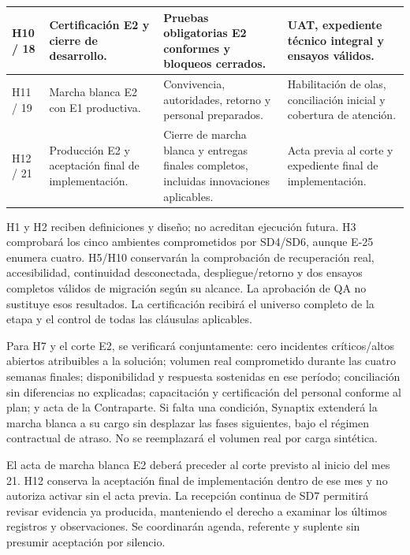 \begin{longtable}{L{.09\textwidth}L{.24\textwidth}L{.32\textwidth}L{.24\textwidth}}
H10 / 18 & Certificación E2 y cierre de desarrollo. & Pruebas obligatorias E2 conformes y bloqueos cerrados. & UAT, expediente técnico integral y ensayos válidos.\\\hline
H11 / 19 & Marcha blanca E2 con E1 productiva. & Convivencia, autoridades, retorno y personal preparados. & Habilitación de olas, conciliación inicial y cobertura de atención.\\\hline
H12 / 21 & Producción E2 y aceptación final de implementación. & Cierre de marcha blanca y entregas finales completos, incluidas innovaciones aplicables. & Acta previa al corte y expediente final de implementación.\\\hline
\end{longtable}

H1 y H2 reciben definiciones y diseño; no acreditan ejecución futura. H3 comprobará los cinco ambientes comprometidos por SD4/SD6, aunque E-25 enumera cuatro. H5/H10 conservarán la comprobación de recuperación real, accesibilidad, continuidad desconectada, despliegue/retorno y dos ensayos completos válidos de migración según su alcance. La aprobación de QA no sustituye esos resultados. La certificación recibirá el universo completo de la etapa y el control de todas las cláusulas aplicables. \parencites[20.1, pp.~34--35]{sd9-bt}[sec.~6.2]{sd9-sd6}

Para H7 y el corte E2, se verificará conjuntamente: cero incidentes críticos/altos abiertos atribuibles a la solución; volumen real comprometido durante las cuatro semanas finales; disponibilidad y respuesta sostenidas en ese período; conciliación sin diferencias no explicadas; capacitación y certificación del personal conforme al plan; y acta de la Contraparte. Si falta una condición, Synaptix extenderá la marcha blanca a su cargo sin desplazar las fases siguientes, bajo el régimen contractual de atraso. No se reemplazará el volumen real por carga sintética. \parencite[art.~17.3, p.~13]{sd9-ba}

El acta de marcha blanca E2 deberá preceder al corte previsto al inicio del mes 21. H12 conserva la aceptación final de implementación dentro de ese mes y no autoriza activar sin el acta previa. La recepción continua de SD7 permitirá revisar evidencia ya producida, manteniendo el derecho a examinar los últimos registros y observaciones. Se coordinarán agenda, referente y suplente sin presumir aceptación por silencio. \parencite[sec.~7.3, Recepción continua seleccionada de E2]{sd9-sd7}

